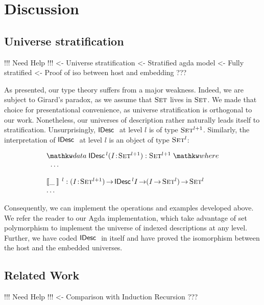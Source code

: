 \section{Discussion}
\label{sec:discussion}

\subsection{Universe stratification}

\begin{wstructure}
!!! Need Help !!!
<- Universe stratification
    <- Stratified agda model
        <- Fully stratified
        <- Proof of iso between host and embedding
    ???
\end{wstructure}

As presented, our type theory suffers from a major weakness. Indeed,
we are subject to Girard's paradox, as we assume that $\Set$ lives in
$\Set$. We made that choice for presentational convenience, as
universe stratification is orthogonal to our work. Nonetheless, our
universes of description rather naturally leads itself to
stratification. Unsurprisingly, $\IDesc{}$ at level $l$ is of type
$\Set^{\blue{l+1}}$. Similarly, the interpretation of $\IDesc{}$ at
level $l$ is an object of type $\Set^{\blue{l}}$:

\[\stk{
\data \IDesc{\!}^{\blue{l}} (\Bhab{\V{I}}{\Set^{\blue{l+1}}}) : \Set^{\blue{l+1}} \where \\
\;\;\ldots \\
\\
\idescop{\_\:}{}{}^{\blue{l}} : \PI{\V{I}}{\Set^{\blue{l+1}}} \IDesc{{\!}^{\blue{l}}I} \To (\V{I} \To \Set^{\blue{l}}) \To \Set^{\blue{l}}    \\
\ldots
}\]

Consequently, we can implement the operations and examples developed
above. We refer the reader to our Agda implementation, which take
advantage of set polymorphism to implement the universe of indexed
descriptions at any level. Further, we have coded $\IDesc{}$ in itself
and have proved the isomorphism between the host and the embedded
universes.

\subsection{Related Work}

\begin{structure}
!!! Need Help !!!
<- Comparison with Induction Recursion
    ???
\end{structure}


